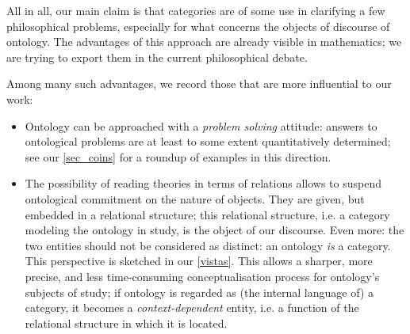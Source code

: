 All in all, our main claim is that categories are of some use in clarifying a few philosophical problems, especially for what concerns the objects of discourse of ontology. The advantages of this approach are already visible in mathematics; we are trying to export them in the current philosophical debate.

Among many such advantages, we record those that are more influential to our work:
\begin{itemize}
	\item Ontology can be approached with a \emph{problem solving} attitude: answers to ontological problems are at least to some extent quantitatively determined; see our \autoref{sec_coins} for a roundup of examples in this direction.
	\item The possibility of reading theories in terms of relations allows to suspend ontological commitment on the nature of objects. They are given, but embedded in a relational structure; this relational structure, i.e. a category modeling the ontology in study, is the object of our discourse. Even more: the two entities should not be considered as distinct: an ontology \emph{is} a category. This perspective is sketched in our \autoref{vistas}. This allows a sharper, more precise, and less time-consuming conceptualisation process for ontology's subjects of study; if ontology is regarded as (the internal language of) a category, it becomes a \emph{context-dependent} entity, i.e. a function of the relational structure in which it is located.

\end{itemize}
